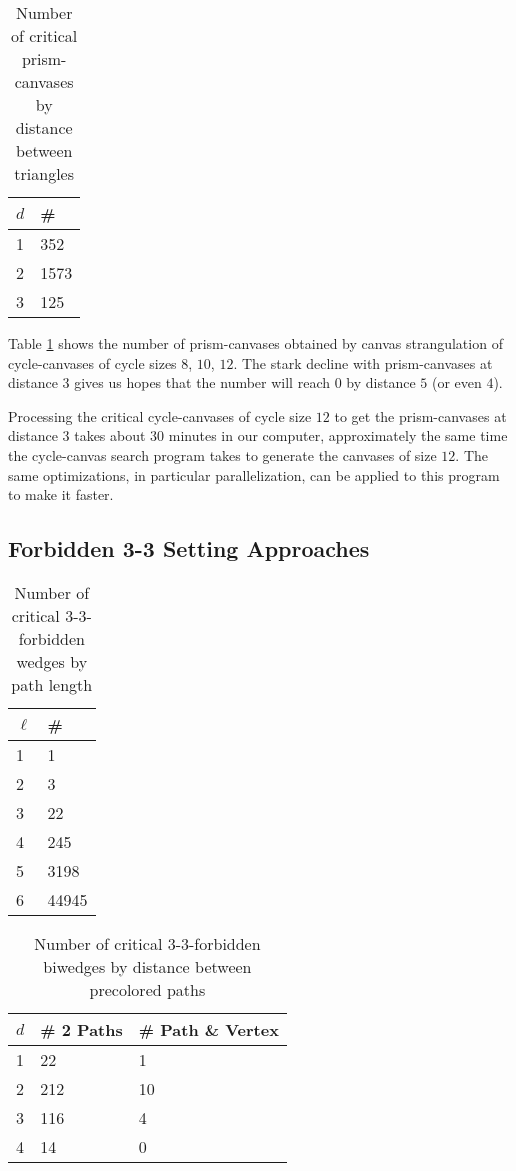 \begin{table}[h]

\centering
\begin{tabular}{l | l}
$d$ & \# \\
\hline
1 & 352 \\
2 & 1573\\ 
3 & 125 \\
\end{tabular}
\caption{Number of critical prism-canvases by distance between triangles}
\label{tab:prismcanvases}
\end{table}

Table \ref{tab:prismcanvases} shows the number of prism-canvases obtained by canvas strangulation
of cycle-canvases of cycle sizes $8$, $10$, $12$. The stark decline with prism-canvases at distance
$3$ gives us hopes that the number will reach $0$ by distance $5$ (or even $4$). 

Processing the critical cycle-canvases of cycle size $12$ to get the prism-canvases at distance $3$
takes about $30$ minutes in our computer, approximately the same time the cycle-canvas search 
program takes to generate the canvases of size $12$. The same optimizations, in particular
parallelization, can be applied to this program to make it faster. 

\subsection{Forbidden 3-3 Setting Approaches}

\begin{table}[h]

\centering
\begin{tabular}{l | l}
$\ell$ & \# \\
\hline
1 & 1 \\
2 & 3 \\ 
3 & 22 \\
4 & 245 \\
5 & 3198 \\
6 & 44945 \\
\end{tabular}
\caption{Number of critical 3-3-forbidden wedges by path length}
\label{tab:wedges}
\end{table}

\begin{table}[h]

\centering
\begin{tabular}{l | l | l}
$d$ & \# 2 Paths & \# Path \& Vertex \\
\hline
1 & 22   & 1\\
2 & 212  & 10\\ 
3 & 116  & 4 \\
4 & 14   & 0
\end{tabular}
\caption{Number of critical 3-3-forbidden biwedges by distance between precolored paths}
\label{tab:biwedges}
\end{table}

